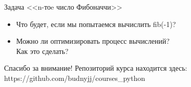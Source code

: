 \documentclass[hyperref={pdftex,unicode}]{beamer}
\begin{document}
\begin{frame}{Задача <<n-тоe число Фибоначчи>>}
  \begin{itemize}
  \item Что будет, если мы попытаемся вычислить fib(-1)?
  \item Можно ли оптимизировать процесс вычислений? \\ Как это сделать?
  \end{itemize}
\end{frame}

\begin{frame}{Спасибо за внимание!}
  Репозиторий курса находится здесь: \\
  https://github.com/budnyjj/courses\_python

\end{frame}
\end{document}
